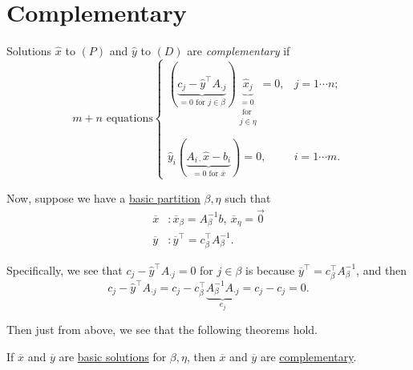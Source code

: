 \section{Complementary}
\begin{definition}[Complementary]\label{def:complementary}
	Solutions \(\hat{x}\) to \((P)\) and \(\hat{y}\) to \((D)\) are \emph{complementary} if
	\[
		m+n\text{ equations}\begin{cases}
			(\underbrace{c_{j} - \hat{y}^{\top} A_{\cdot j}}_{ = 0\text{ for }j\in \beta}) \underbrace{\hat{x}_j}_{ \substack{= 0 \\\text{ for }\\j\in \eta}} = 0, & j = 1\cdots n; \\\\
			\hat{y}_i(\underbrace{A_{i\cdot} \hat{x} - b_{i}}_{ = 0 \text{ for }\overline{x}}) = 0, & i = 1\cdots m.
		\end{cases}
	\]
\end{definition}

Now, suppose we have a \hyperref[def:basic-partition]{basic partition} \(\beta, \eta\) such that
\[
	\begin{split}
		\overline{x}&\colon \overline{x}_{\beta} = A^{-1}_{\beta}b,\ \overline{x}_{\eta} = \vec{0}\\
		\overline{y}&\colon \overline{y}^{\top} = c^{\top}_{\beta}A^{-1}_{\beta}.
	\end{split}
\]

\begin{note}
	Specifically, we see that \(c_{j} - \hat{y}^{\top}A_{\cdot j} = 0\) for \(j\in\beta\) is because \(\overline{y}^{\top} = c^{\top}_{\beta}A^{-1}_{\beta}\), and then
	\[
		c_{j} - \hat{y}^{\top}A_{\cdot j} = c_{j} - c^{\top}_{\beta}\underbrace{A^{-1}_{\beta}A_{\cdot j}}_{e_{j}} = c_{j} - c_{j} = 0.
	\]
\end{note}

Then just from above, we see that the following theorems hold.
\begin{theorem}\label{thm:lec10-1}
	If \(\overline{x}\) and \(\overline{y}\) are \hyperref[def:basic-solution]{basic solutions} for \(\beta, \eta\), then \(\overline{x}\) and \(\overline{y}\) are
	\hyperref[def:complementary]{complementary}.
\end{theorem}

